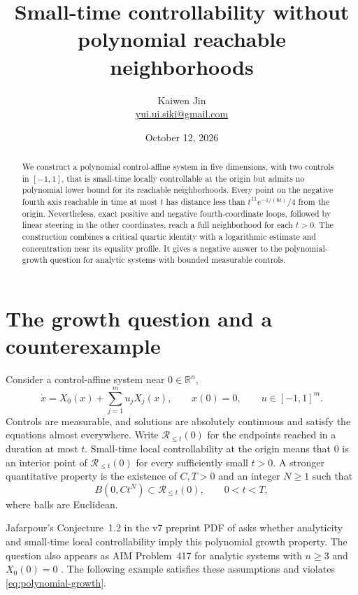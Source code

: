 \documentclass[11pt,a4paper]{article}
\title{Small-time controllability without polynomial reachable neighborhoods}
\author{Kaiwen Jin\\\small\href{mailto:yui.ui.siki@gmail.com}{yui.ui.siki@gmail.com}}
\date{October 12, 2026}
\newcommand{\R}{\mathbb{R}}
\newcommand{\Reach}{\mathcal{R}}
\begin{document}
\maketitle

\begin{abstract}
We construct a polynomial control-affine system in five dimensions, with two
controls in $[-1,1]$, that is small-time locally controllable at the origin
but admits no polynomial lower bound for its reachable neighborhoods.
Every point on the negative fourth axis reachable in time at most $t$ has
distance less than $t^{11}e^{-1/(6t)}/4$ from the origin.
Nevertheless, exact positive and negative fourth-coordinate loops, followed
by linear steering in the other coordinates, reach a full neighborhood for
each $t>0$. The construction combines a critical quartic identity with a
logarithmic estimate and concentration near its equality profile.
It gives a negative answer to the polynomial-growth question for analytic
systems with bounded measurable controls.
\end{abstract}

\section{The growth question and a counterexample}

Consider a control-affine system near $0\in\R^n$,
\[
 \dot x=X_0(x)+\sum_{j=1}^m u_jX_j(x),\qquad x(0)=0,
 \qquad u\in[-1,1]^m.
\]
Controls are measurable, and solutions are absolutely continuous and satisfy
the equations almost everywhere. Write $\Reach_{\le t}(0)$ for the endpoints
reached in a duration at most $t$. Small-time local controllability at the
origin means that $0$ is an interior point of $\Reach_{\le t}(0)$ for every
sufficiently small $t>0$. A stronger quantitative property is the existence
of $C,T>0$ and an integer $N\ge1$ such that
\begin{equation}\label{eq:polynomial-growth}
 B(0,Ct^N)\subset\Reach_{\le t}(0),\qquad 0<t<T,
\end{equation}
where balls are Euclidean.

Jafarpour's Conjecture~1.2 in the v7 preprint PDF of
\cite{Jafarpour} asks whether analyticity and small-time local
controllability imply this polynomial growth property. The question also
appears as AIM Problem~417 for analytic systems with $n\ge3$ and $X_0(0)=0$
\cite{AIM417}. The following example satisfies these assumptions and violates
\eqref{eq:polynomial-growth}.
\end{document}
